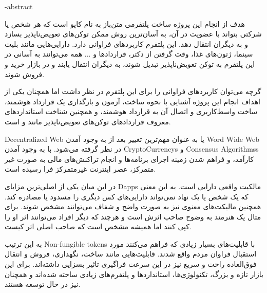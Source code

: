 



\fa-abstract{

هدف از انجام این پروژه ساخت پلتفرمی متن‌باز
به نام کاپو است که هر شخص یا شرکتی بتواند با عضویت در آن،
به آسان‌ترین روش ممکن توکن‌های تعویض‌ناپذیر‌ بسازد و به دیگران انتقال دهد.
این پلتفرم کاربردهای فراوانی دارد.
دارایی‌هایی مانند بلیت سینما، ژتون‌های غذا، وقت گرفتن از دکتر، قراردادها و ... همه
می‌توانند به آسانی در این پلتفرم به توکن تعویض‌ناپذیر تبدیل شوند،
به دیگران انتقال یابند و در بازار خرید و فروش شوند.

گرچه می‌توان کاربردهای فراوانی را برای این پلتفرم در نظر داشت
اما همچنان یکی از اهداف انجام این پروژه آشنایی با نحوه ساخت، آزمون و بارگذاری یک قرارداد هوشمند،
ساخت واسط‌کاربری و اتصال آن به قرارداد هوشمند،
و همچنین شناخت استاندارد‌های معروف قرارداد‌های توکن‌های تعویض‌ناپذیر مانند
و
است.

\gls{Decentralized Web}
یا
 به عنوان مهم‌ترین تغییر بعد از به وجود آمدن
\gls{Word Wide Web}
 در نظر گرفته می‌شود. با به وجود آمدن
\glspl{CryptoCurrency}
و
\glspl{Consensus Algorithms}
کارآمد، و فراهم شدن زمینه اجرای برنامه‌ها و انجام تراکنش‌های مالی به صورت غیر متمرکز،
عصر اینترنت غیرمتمرکز فرا رسیده است.

در این میان یکی از اصلی‌ترین مزایای 
\glspl{Dapp}
مالکیت واقعی دارایی است.
به این معنی که یک شخص یا یک نهاد نمی‌تواند دارایی‌های کس دیگری را مسدود یا مصادره کند.
همچنین مالیکت‌های معنوی نیز به صورت واضح و شفاف می‌توانند مشخص شوند.
برای مثال یک هنرمند به وضوح صاحب اثرش است و هرچند که دیگر افراد می‌توانند اثر او را کپی کنند
اما همیشه مشخص است که صاحب اصلی اثر کیست.

به این ترتیب 
\glspl{Non-fungible token}
با قابلیت‌های بسیار زیادی که فراهم می‌کنند مورد استقبال فراوان مردم واقع شدند.
قابلیت‌هایی مانند ساخت، نگهداری، فروش و انتقال فوق‌العاده راحت و سریع نیز
در این سرعت فراگیری تاثیر بسزایی داشته‌اند.
برای این بازار تازه و بزرگ، تکنولوژی‌ها، استاندارد‌ها و پلتفرم‌های زیادی ساخته شده‌اند
و همچنان نیز در حال توسعه هستند.
}
